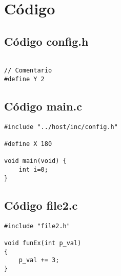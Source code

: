 \chapter{Código}
\label{ap:cod}


\section{Código config.h}

\begin{lstlisting}

// Comentario 
#define Y 2

\end{lstlisting}


\section{Código main.c}
\label{ap:codMain}
\begin{lstlisting}
#include "../host/inc/config.h" 

#define X 180

void main(void) {
	int i=0;
}
 \end{lstlisting}
 
 
\section{Código file2.c}
 
\begin{lstlisting}
#include "file2.h"

void funEx(int p_val)
{
	p_val += 3;	
}
 \end{lstlisting}